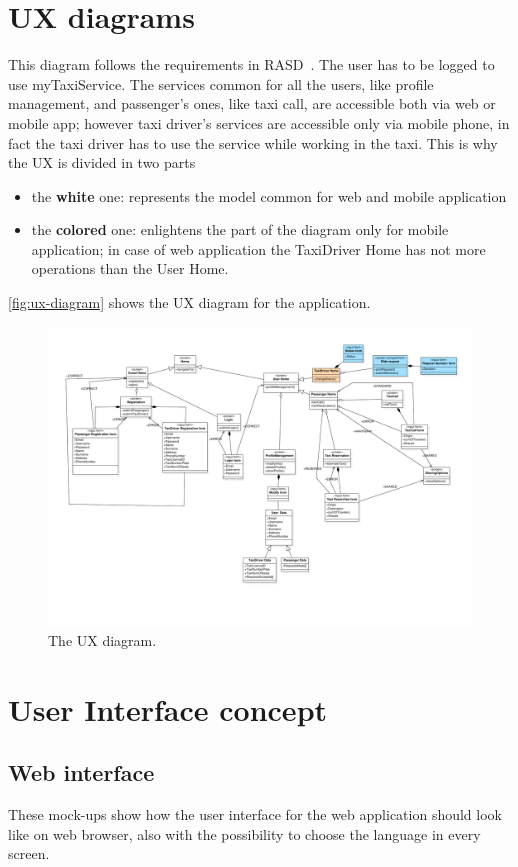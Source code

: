 \section{UX diagrams}
This diagram follows the requirements in RASD~\cite{rasd}. 
The user has to be logged to use myTaxiService.
The services common for all the users, like profile management, and passenger's ones, like taxi call, are accessible both via web or mobile app; however taxi driver's services are accessible only via mobile phone, in fact the taxi driver has to use the service while working in the taxi.
This is why the UX is divided in two parts
\begin{itemize}
\item the {\bf white} one: represents the model common for web and mobile application
\item the {\bf colored} one: enlightens the part of the diagram only for mobile application; in case of web application the TaxiDriver Home has not more operations than the User Home.
\end{itemize}
\autoref{fig:ux-diagram} shows the UX diagram for the application.

\begin{figure}[h]
\centering
\includegraphics[width=\textwidth]{diagrams/UXdiagramSE2}
\caption{The UX diagram.}
\label{fig:ux-diagram}
\end{figure}

\FloatBarrier
\section{User Interface concept}

\subsection{Web interface}
These mock-ups show how the user interface for the web application should look like on web browser, also with the possibility to choose the language in every screen.

